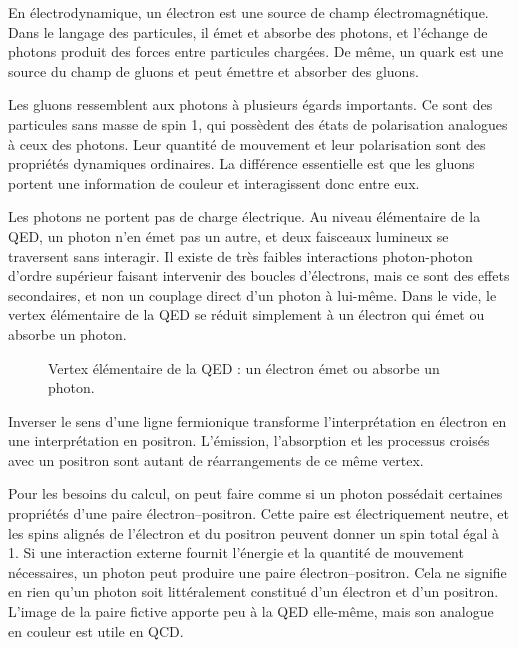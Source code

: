 En électrodynamique, un électron est une source de champ électromagnétique. Dans le langage des particules, il émet et absorbe des photons, et l’échange de photons produit des forces entre particules chargées. De même, un quark est une source du champ de gluons et peut émettre et absorber des gluons.

Les gluons ressemblent aux photons à plusieurs égards importants. Ce sont des particules sans masse de spin 1, qui possèdent des états de polarisation analogues à ceux des photons. Leur quantité de mouvement et leur polarisation sont des propriétés dynamiques ordinaires. La différence essentielle est que les gluons portent une information de couleur et interagissent donc entre eux.

Les photons ne portent pas de charge électrique. Au niveau élémentaire de la QED, un photon n’en émet pas un autre, et deux faisceaux lumineux se traversent sans interagir. Il existe de très faibles interactions photon-photon d’ordre supérieur faisant intervenir des boucles d’électrons, mais ce sont des effets secondaires, et non un couplage direct d’un photon à lui-même. Dans le vide, le vertex élémentaire de la QED se réduit simplement à un électron qui émet ou absorbe un photon.

\begin{figure}[h]
\centering
{}
\caption{Vertex élémentaire de la QED : un électron émet ou absorbe un photon.}
\end{figure}

Inverser le sens d’une ligne fermionique transforme l’interprétation en électron en une interprétation en positron. L’émission, l’absorption et les processus croisés avec un positron sont autant de réarrangements de ce même vertex.

Pour les besoins du calcul, on peut faire comme si un photon possédait certaines propriétés d’une paire électron--positron. Cette paire est électriquement neutre, et les spins alignés de l’électron et du positron peuvent donner un spin total égal à 1. Si une interaction externe fournit l’énergie et la quantité de mouvement nécessaires, un photon peut produire une paire électron--positron. Cela ne signifie en rien qu’un photon soit littéralement constitué d’un électron et d’un positron. L’image de la paire fictive apporte peu à la QED elle-même, mais son analogue en couleur est utile en QCD.

